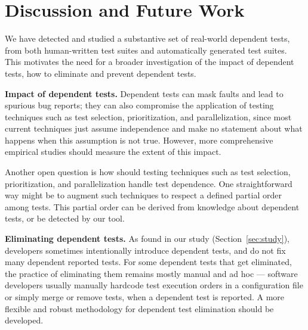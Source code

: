 \section{Discussion and Future Work}
\label{sec:discussion}



We have detected and studied a substantive set of
real-world dependent tests, from both human-written test suites and
automatically generated test suites. This motivates
the need for a broader
investigation of the impact of dependent tests,
how to eliminate and prevent dependent tests.

\tinyrelax

\noindent \textbf{{Impact of dependent tests.}}
Dependent tests can mask faults and lead to
spurious bug reports; they can also 
compromise the application of
testing techniques such as test selection,
prioritization, and parallelization, since
most current techniques just assume independence and
make no statement about what happens when this
assumption is not true. However,
more comprehensive empirical studies should measure  
the extent of this impact.


Another open question is how should
testing techniques such as test
selection, prioritization, and parallelization
handle test dependence.
One straightforward way 
might be to augment such techniques to respect a
defined partial order among tests. This partial order
can be derived from knowledge about dependent tests,
or be detected by our \ourtool tool.


\tinyrelax

\noindent \textbf{{Eliminating dependent tests.}}
As found in our study (Section~\ref{sec:study}),
developers sometimes intentionally introduce dependent tests,
and do not fix many dependent reported tests.
For some dependent tests that get eliminated,
the practice of eliminating them
remains mostly manual and ad hoc --- software developers
usually manually hardcode test
execution orders in a configuration file or
simply merge or remove tests, when a dependent test is reported. 
A more flexible and robust methodology for
dependent test elimination should be developed.

